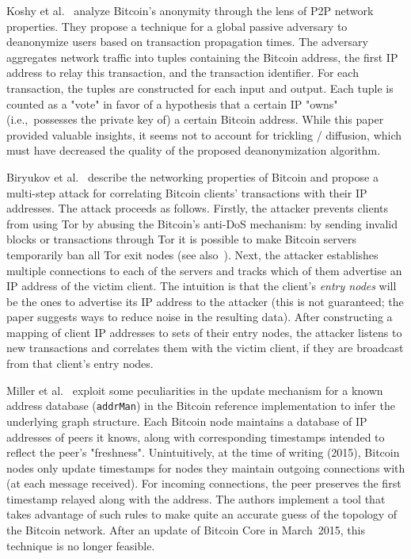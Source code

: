 Koshy et al.~\cite{Koshy2014} analyze Bitcoin's anonymity through the lens of P2P network properties.
They propose a technique for a global passive adversary to deanonymize users based on transaction propagation times.
The adversary aggregates network traffic into tuples containing the Bitcoin address, the first IP address to relay this transaction, and the transaction identifier.
For each transaction, the tuples are constructed for each input and output.
Each tuple is counted as a "vote" in favor of a hypothesis that a certain IP "owns" (i.e.,~possesses the private key of) a certain Bitcoin address.
While this paper provided valuable insights, it seems not to account for trickling / diffusion, which must have decreased the quality of the proposed deanonymization algorithm.

Biryukov et al.~\cite{Biryukov2014} describe the networking properties of Bitcoin and propose a multi-step attack for correlating Bitcoin clients' transactions with their IP addresses.
The attack proceeds as follows.
Firstly, the attacker prevents clients from using Tor by abusing the Bitcoin's anti-DoS mechanism: by sending invalid blocks or transactions through Tor it is possible to make Bitcoin servers temporarily ban all Tor exit nodes (see also~\cite{Biryukov2015}).
Next, the attacker establishes multiple connections to each of the servers and tracks which of them advertise an IP address of the victim client.
The intuition is that the client's \textit{entry nodes} will be the ones to advertise its IP address to the attacker (this is not guaranteed; the paper suggests ways to reduce noise in the resulting data).
After constructing a mapping of client IP addresses to sets of their entry nodes, the attacker listens to new transactions and correlates them with the victim client, if they are broadcast from that client's entry nodes.

Miller et al.~\cite{Miller2015} exploit some peculiarities in the update mechanism for a known address database (\texttt{addrMan}) in the Bitcoin reference implementation to infer the underlying graph structure.
Each Bitcoin node maintains a  database of IP addresses of peers it knows, along with corresponding timestamps intended to reflect the peer's "freshness".
Unintuitively, at the time of writing (2015), Bitcoin nodes only update timestamps for nodes they maintain outgoing connections with (at each message received).
For incoming connections, the peer preserves the first timestamp relayed along with the address.
The authors implement a tool that takes advantage of such rules to make quite an accurate guess of the topology of the Bitcoin network.
After an update of Bitcoin Core in March~2015, this technique is no longer feasible.


